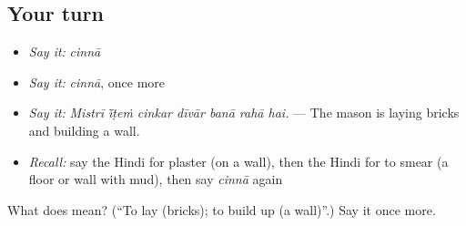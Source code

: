 \subsection*{Your turn}
\begin{itemize}
\raggedright
  \item \emph{Say it:} \emph{cinnā}
  \item \emph{Say it:} \emph{cinnā}, once more
  \item \emph{Say it:} \emph{Mistrī ī̃ṭeṁ cinkar dīvār banā rahā hai.} — The mason is laying bricks and building a wall.
  \item \emph{Recall:} say the Hindi for plaster (on a wall), then the Hindi for to smear (a floor or wall with mud), then say \emph{cinnā} again
\end{itemize}

\begin{tcolorbox}[breakable,colback=teal!4,colframe=teal!35!black,title={Before you move on}]
What does  mean? (\textquotedblleft{}To lay (bricks); to build up (a wall)\textquotedblright{}.) Say it once more.
\end{tcolorbox}
